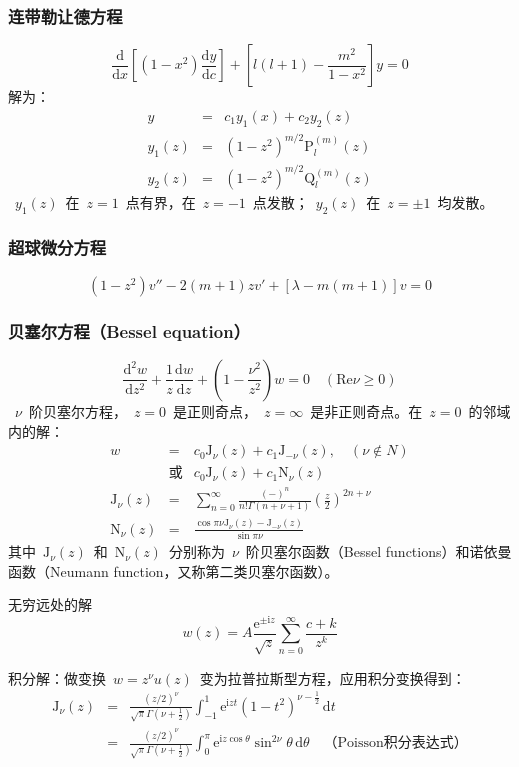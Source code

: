 \documentclass[12pt,a4paper]{article}
\newcommand\dif{\mathrm{d}}
\newcommand\diff{\,\mathrm{d}}
\renewcommand{\[}{\ $\displaystyle}
\renewcommand{\]}{$\ }%
\newcommand{\fdif}[2]{\ensuremath{\frac{\dif #1}{\dif #2}}}
\newcommand{\fdifsq}[2]{\ensuremath{\frac{\dif^2 #1}{\dif #2^2}}}
\newcommand\mi{\mathrm{i}}
\newcommand\e{\mathrm{e}}
\newcommand{\summ}[2][n]{\sum_{#1=#2}^\infty}
\begin{document}
	 \subsubsection{连带勒让德方程}
	  $$
	    \fdif{}{x}\left[(1-x^2)\fdif{y}{c}\right]+\left[l(l+1)-\frac{m^2}{1-x^2}\right]y = 0
	  $$
	  解为：
	  \begin{eqnarray*}
	    y &=& c_1y_1(x) + c_2y_2(z)\\
	    y_1(z) &=& (1-z^2)^{m/2}\mathrm{P}_{l}^{(m)}(z) \\
	    y_2(z) &=& (1-z^2)^{m/2}\mathrm{Q}_{l}^{(m)}(z)
	  \end{eqnarray*}
	  \[y_1(z)\]在\[z=1\]点有界，在\[z=-1\]点发散；\[y_2(z)\]在\[z=\pm 1\]均发散。
	  
	 \subsubsection{超球微分方程}
	 	$$
	 	  (1-z^2)v'' - 2(m+1)zv' + [\lambda - m(m+1)]v = 0
	 	$$
	 \subsubsection{贝塞尔方程（Bessel equation）}
	 \newcommand{\fj}[2][\nu]{\ensuremath{\mathrm{J}_{#1}\left(#2\right)}}
	 \newcommand{\fn}[2][\nu]{\ensuremath{\mathrm{N}_{#1}\left(#2\right)}}
	 	$$
	 	  \fdifsq{w}{z} + \frac 1z\fdif{w}{z} + \left(1-\frac{\nu^2}{z^2}\right)w = 0\quad(\mathrm{Re}\nu \geq 0)
	 	$$
	 	\[\nu\]阶贝塞尔方程，\[z=0\]是正则奇点，\[z=\infty\]是非正则奇点。在\[z=0\]的邻域内的解：
	 	\begin{eqnarray*}
	 	  w &=& c_0 \fj{z} + c_1\fj[-\nu]{z} ,\quad (\nu \notin N) \\
	 	    &\mbox{或}& c_0 \fj{z} + c_1\fn{z} \\
	 	  \fj{z} &=& \summ{0} \frac{(-)^n}{n!\Gamma(n+\nu+1)}\left(\frac z2\right)^{2n+\nu}\\
	 	  \fn{z} &=& \frac{\cos \pi\nu \fj{z} - \fj[-\nu]{z}}{\sin \pi\nu} 
	 	\end{eqnarray*}
	 	其中\[\fj{z}\]和\[\fn{z}\]分别称为\[\nu\]阶贝塞尔函数（Bessel functions）和诺依曼函数（Neumann function，又称第二类贝塞尔函数）。
	 	
	 	无穷远处的解
	 	$$
	 	  w(z) = A\frac{\e^{\pm\mi z}}{\sqrt{z}}\summ{0}\frac{c+k}{z^k}
	 	$$
	 	
	 	积分解：做变换\[w = z^\nu u(z)\]变为拉普拉斯型方程，应用积分变换得到：
	 	\begin{eqnarray*}
	 	  \fj{z} &=& \frac{(z/2)^\nu}{\sqrt{\pi}\Gamma(\nu + \frac{1}{2})}\int_{-1}^{1}\e^{\mi zt}(1-t^2)^{\nu-\frac 12}\diff t \\
	 	  &=& \frac{(z/2)^\nu}{\sqrt{\pi}\Gamma(\nu + \frac{1}{2})} \int_0^\pi\e^{\mi z\cos \theta}\sin ^{2\nu}\theta \diff \theta \quad\mbox{（Poisson积分表达式）}
	 	\end{eqnarray*}
	 
\end{document}
